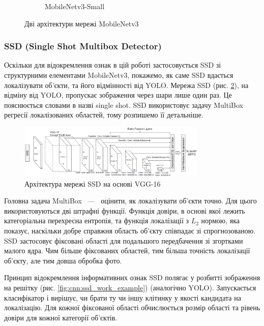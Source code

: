 \begin{figure}[H]
\begin{subfigure}[c]{0.4\textwidth}
        \caption{MobileNetv3-Small
        }
    \end{subfigure}
    \caption{Дві архітектури мережі MobileNetv3 \cite{mobilenetv3}
        \label{fig:cnn:mobilenetv3_architecture}
    }
\end{figure}

\subsubsection{SSD (Single Shot Multibox Detector)}

Оскільки для відокремлення ознак в цій роботі застосовується SSD зі
структурними елементами MobileNetv3, покажемо, як саме SSD вдається
локалізувати об'єкти, та його відмінності від YOLO.
Мережа SSD (рис. \ref{fig:cnn:ssd_architecture}), на відміну від YOLO, пропускає зображення
через шари лише один раз. Це пояснюється словами в назві single shot. 
SSD використовує задачу MultiBox регресії локалізованих областей, тому розпишемо її детальніше.
\begin{figure}[H]
    \centering
    \includegraphics[width=0.8\textwidth]{images/cnn_ssd_architecture}
    \caption{Архітектура мережі SSD на основі VGG-16    \cite{ssd}
        \label{fig:cnn:ssd_architecture}
    }
\end{figure}
Головна задача MultiBox ~---~ оцінити, як локалізувати об'єкти точно. Для цього використовуються
дві штрафні функції. Функція довіри, в основі якої лежить категоріальна перехресна ентропія, та
функція локалізації з $L_2$ нормою, яка показує, наскільки добре справжня область об'єкту співпадає
зі спрогнозованою.
SSD застосовує фіксовані області для подальшого передбачення
зі згортками малого ядра.
Чим більше фіксованих областей, тим більша точність локалізації об'єкту,
але тим довша обробка фото.

Принцип відокремлення інформативних ознак SSD полягає у розбитті зображення на решітку
(рис. \ref{fig:cnn:ssd_work_example}) (аналогічно YOLO). Запускається класифікатор
і вирішує, чи брати ту чи іншу клітинку у якості кандидата на локалізацію. 
Для кожної фіксованої області обчислюється розмір
області та рівень довіри для кожної категорії об'єктів.

